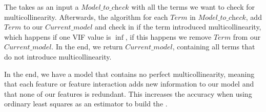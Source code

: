 The  takes as an input a $\textit{Model\_to\_check}$ with all the terms we want to check for multicollinearity. 
Afterwards, the algorithm for each $\textit{Term}$ in $\textit{Model\_to\_check}$, 
add $\textit{Term}$ to our $\textit{Current\_model}$ and check in  if the term introduced multicollinearity, 
which happens if one \acs{VIF} value is $\inf$, if this happens we remove $\textit{Term}$ from our $\textit{Current\_model}$. 
In the end, we return $\textit{Current\_model}$, containing all terms that do not introduce multicollinearity.

In the end, we have a model that contains no perfect multicollinearity, 
meaning that each feature or feature interaction adds new information to our model and that none of our features is redundant. 
This increases the accuracy when using ordinary least squares as an estimator to build the \perfInfluenceModel.